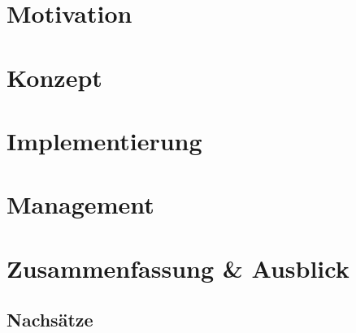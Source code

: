 \documentclass[a4paper,
               final,
               draft,
               11pt]{book}
\begin{document}

\chapter{Motivation}


\chapter{Konzept}


\chapter{Implementierung}



\chapter{Management}


\chapter{Zusammenfassung \& Ausblick}


\begin{appendix}

\chapter{Nachsätze}


\end{appendix}

\backmatter

\printindex

\begin{sloppypar}
	\printbibliography
\end{sloppypar}
\end{document}
